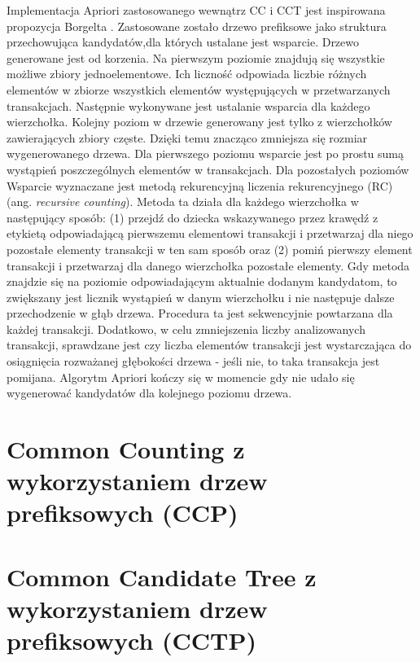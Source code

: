 Implementacja Apriori zastosowanego wewnątrz CC i CCT jest inspirowana propozycja Borgelta \cite{Borgelt}. Zastosowane zostało drzewo prefiksowe jako struktura przechowująca kandydatów,dla których ustalane jest wsparcie. Drzewo generowane jest od korzenia. Na pierwszym poziomie znajdują się wszystkie możliwe zbiory jednoelementowe. Ich liczność odpowiada liczbie różnych elementów w zbiorze wszystkich elementów występujących w przetwarzanych transakcjach. Następnie wykonywane jest ustalanie wsparcia dla każdego wierzchołka. Kolejny poziom w drzewie generowany jest tylko z wierzchołków zawierających zbiory częste. Dzięki temu znacząco zmniejsza się rozmiar wygenerowanego drzewa. Dla pierwszego poziomu wsparcie jest po prostu sumą wystąpień poszczególnych elementów w transakcjach. Dla pozostałych poziomów Wsparcie wyznaczane jest metodą rekurencyjną liczenia rekurencyjnego (RC) (ang. \textit{recursive counting}). Metoda ta działa dla każdego wierzchołka w następujący sposób: (1) przejdź do dziecka wskazywanego przez krawędź z etykietą odpowiadającą pierwszemu elementowi transakcji i przetwarzaj dla niego pozostałe elementy transakcji w ten sam sposób oraz (2) pomiń pierwszy element transakcji i przetwarzaj dla danego wierzchołka pozostałe elementy. Gdy metoda znajdzie się na poziomie odpowiadającym aktualnie dodanym kandydatom, to zwiększany jest licznik wystąpień w danym wierzchołku i nie następuje dalsze przechodzenie w głąb drzewa. Procedura ta jest sekwencyjnie powtarzana dla każdej transakcji. Dodatkowo, w celu zmniejszenia liczby analizowanych transakcji, sprawdzane jest czy liczba elementów transakcji jest wystarczająca do osiągnięcia rozważanej głębokości drzewa - jeśli nie, to taka transakcja jest pomijana. Algorytm Apriori kończy się w momencie gdy nie udało się wygenerować kandydatów dla kolejnego poziomu drzewa.

\section{Common Counting z wykorzystaniem drzew prefiksowych (CCP)}
\label{c44}



\section{Common Candidate Tree z wykorzystaniem drzew prefiksowych (CCTP)}
\label{c45}
